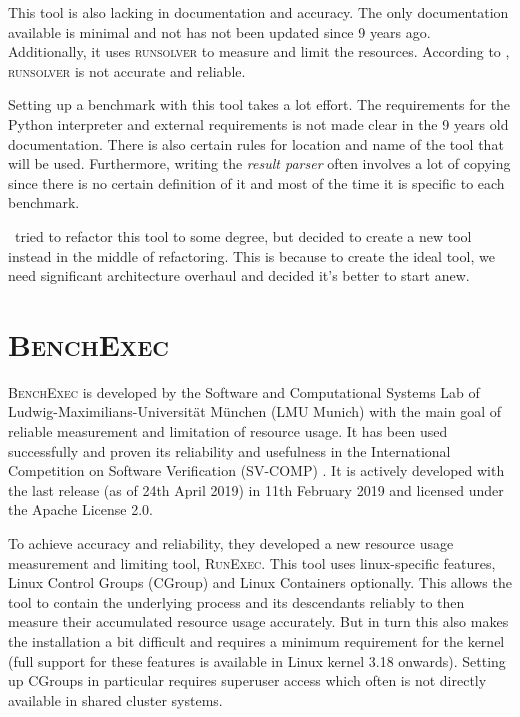 This tool is also lacking in documentation and accuracy.
The only documentation available is minimal and not has not been updated since 9 years ago.
Additionally, it uses \textsc{runsolver} to measure and limit the resources.
According to \citet{beyerReliableBenchmarkingRequirements2019}, \textsc{runsolver} is not accurate and reliable.

Setting up a benchmark with this tool takes a lot effort.
The requirements for the Python interpreter and external requirements is not made clear in the 9 years old documentation.
There is also certain rules for location and name of the tool that will be used.
Furthermore, writing the \textit{result parser} often involves a lot of copying since there is no certain definition of it and most of the time it is specific to each benchmark.

\First~tried to refactor this tool to some degree, but decided to create a new tool instead in the middle of refactoring.
This is because to create the ideal tool, we need significant architecture overhaul and decided it's better to start anew.

\section{\textsc{BenchExec}}
\label{sec:benchmarking.impl.benchexec}

\textsc{BenchExec} \citep{philipp_wendler_2019_2561835} is developed by the Software and Computational Systems Lab of Ludwig-Maximilians-Universität München (LMU Munich) with the main goal of reliable measurement and limitation of resource usage.
It has been used successfully and proven its reliability and usefulness in the International Competition on Software Verification (SV-COMP) \citep{beyerReliableBenchmarkingRequirements2019}.
It is actively developed with the last release (as of 24th April 2019) in 11th February 2019 and licensed under the Apache License 2.0.

To achieve accuracy and reliability, they developed a new resource usage measurement and limiting tool, \textsc{RunExec}.
This tool uses linux-specific features, Linux Control Groups (CGroup) and Linux Containers optionally.
This allows the tool to contain the underlying process and its descendants reliably to then measure their accumulated resource usage accurately.
But in turn this also makes the installation a bit difficult and requires a minimum requirement for the kernel (full support for these features is available in Linux kernel 3.18 onwards).
Setting up CGroups in particular requires superuser access which often is not directly available in shared cluster systems.

